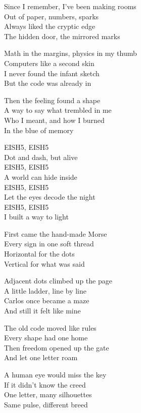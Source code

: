 \begin{lyrics}
Since I remember, I’ve been making rooms\\
Out of paper, numbers, sparks\\
Always liked the cryptic edge\\
The hidden door, the mirrored marks

Math in the margins, physics in my thumb\\
Computers like a second skin\\
I never found the infant sketch\\
But the code was already in

Then the feeling found a shape\\
A way to say what trembled in me\\
Who I meant, and how I burned\\
In the blue of memory

EISH5, EISH5\\
Dot and dash, but alive\\
EISH5, EISH5\\
A world can hide inside\\
EISH5, EISH5\\
Let the eyes decode the night\\
EISH5, EISH5\\
I built a way to light

First came the hand-made Morse\\
Every sign in one soft thread\\
Horizontal for the dots\\
Vertical for what was said

Adjacent dots climbed up the page\\
A little ladder, line by line\\
Carlos once became a maze\\
And still it felt like mine

The old code moved like rules\\
Every shape had one home\\
Then freedom opened up the gate\\
And let one letter roam

A human eye would miss the key\\
If it didn’t know the creed\\
One letter, many silhouettes\\
Same pulse, different breed


\end{lyrics}
